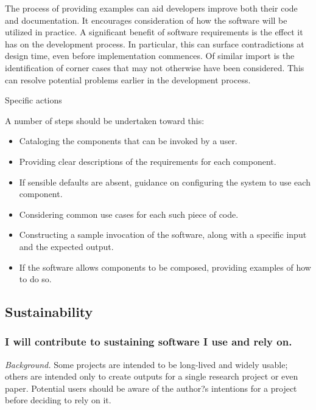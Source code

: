 \documentclass[a4paper,UKenglish]{dagman}
\renewcommand{\paragraph}[1]{\subsubsection*{#1}\xspace}
\begin{document}
The process of providing examples can aid developers improve both their code and documentation. It encourages consideration of how the software will be utilized in practice. A significant benefit of software requirements is the effect it has on the development process. In particular, this can surface contradictions at design time, even before implementation commences. Of similar import is the identification of corner cases that may not otherwise have been considered. This can resolve potential problems earlier in the development process.

Specific actions

A number of steps should be undertaken toward this:
\begin{itemize}
\item Cataloging the components that can be invoked by a user.
\item Providing clear descriptions of the requirements for each component.
\item If sensible defaults are absent, guidance on configuring the system to use each component.
\item Considering common use cases for each such piece of code.
\item Constructing a sample invocation of the software, along with a specific input and the expected output.
\item If the software allows components to be composed, providing examples of how to do so.
\end{itemize}


\subsection{Sustainability}


\paragraph{I will contribute to sustaining software I use and rely on.}


\emph{Background.} Some projects are intended to be long-lived and widely usable; others are intended only to create outputs for a single research project or even paper. Potential users should be aware of the author?s intentions for a project before deciding to rely on it.  
\end{document}
